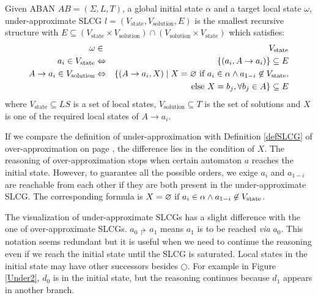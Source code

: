 \begin{definition}
Given ABAN $AB = (\Sigma,L,T)$, a global initial state $\alpha$ and a target local state $\omega$, under-approximate SLCG $l= (V_{\mathrm{state}},V_{\mathrm{solution}},E)$ is the smallest recursive structure with $E \subseteq (V_{\mathrm{state}}\times V_{\mathrm{solution}})\cap (V_{\mathrm{solution}}\times V_{\mathrm{state}})$ which satisfies:
\begin{eqnarray*}
    \omega&\in& V_{\mathrm{state}} \\
    a_i\in V_{\mathrm{state}} &\Leftrightarrow& \{ (a_i, A\to a_i)\}\subseteq E \\
    A\to a_i\in V_{\mathrm{solution}}&\Leftrightarrow& \{ (A\to a_i,X)\mid X= \varnothing \text{ \rm if } a_i\in \alpha\land a_{1-i}\not\in V_{\mathrm{state}},\\
    &&\text{else }  X= b_j, \forall b_j\in A\}\subseteq E
\end{eqnarray*}
where $V_{\mathrm{state}}\subseteq LS$ is a set of local states, $V_{\mathrm{solution}}\subseteq T$ is the set of solutions and $X$ is one of the required local states of $A\to a_i$. 
\end{definition}

If we compare the definition of under-approximation with Definition \ref{defSLCG} of over-approximation on page \pageref{defSLCG}, the difference lies in the condition of $X$. 
The reasoning of over-approximation stops when certain automaton $a$ reaches the initial state. 
However, to guarantee all the possible orders, we exige $a_i$ and $a_{1-i}$ are reachable from each other if they are both present in the under-approximate SLCG.
The corresponding formula is $X= \varnothing \text{ \rm if } a_i\in \alpha\land a_{1-i}\not\in V_{\mathrm{state}}$.

The visualization of under-approximate SLCGs has a slight difference with the one of over-approximate SLCGs.
$a_0\Rsh a_1$ means $a_1$ is to be reached \textit{via} $a_0$.
This notation seems redundant but it is useful when we need to continue the reasoning even if we reach the initial state until the SLCG is saturated.
Local states in the initial state may have other successors besides $\bigcirc$.
For example in Figure \ref{Under2}, $d_0$ is in the initial state, but the reasoning continues because $d_1$ appears in another branch.

